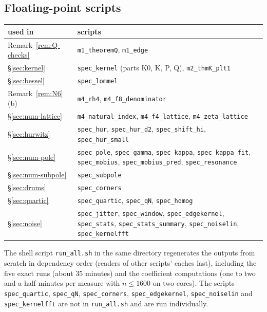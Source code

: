 \subsection*{Floating-point scripts}
\begin{center}
\small
\begin{tabular}{lp{10cm}}
\toprule
used in & scripts\\
\midrule
Remark~\ref{rem:Q-checks} & \texttt{m1\_theoremQ}, \texttt{m1\_edge}\\
\S\ref{sec:kernel} & \texttt{spec\_kernel} (parts K0, K, P, Q), \texttt{m2\_thmK\_plt1}\\
\S\ref{sec:bessel} & \texttt{spec\_lommel}\\
Remark~\ref{rem:N6}(b) & \texttt{m4\_rh4}, \texttt{m4\_f8\_denominator}\\
\S\ref{sec:num-lattice} & \texttt{m4\_natural\_index}, \texttt{m4\_f4\_lattice}, \texttt{m4\_zeta\_lattice}\\
\S\ref{sec:hurwitz} & \texttt{spec\_hur}, \texttt{spec\_hur\_d2}, \texttt{spec\_shift\_hi}, \texttt{spec\_hur\_small}\\
\S\ref{sec:num-pole} & \texttt{spec\_pole}, \texttt{spec\_gamma}, \texttt{spec\_kappa}, \texttt{spec\_kappa\_fit},
  \texttt{spec\_mobius}, \texttt{spec\_mobius\_pred}, \texttt{spec\_resonance}\\
\S\ref{sec:num-subpole} & \texttt{spec\_subpole}\\
\S\ref{sec:drums} & \texttt{spec\_corners}\\
\S\ref{sec:quartic} & \texttt{spec\_quartic}, \texttt{spec\_qN}, \texttt{spec\_homog}\\
\S\ref{sec:noise} & \texttt{spec\_jitter}, \texttt{spec\_window}, \texttt{spec\_edgekernel}, \texttt{spec\_stats},
  \texttt{spec\_stats\_summary}, \texttt{spec\_noiselin}, \texttt{spec\_kernelfft}\\
\bottomrule
\end{tabular}
\end{center}

The shell script \texttt{run\_all.sh} in the same directory regenerates the outputs from scratch in dependency order
(readers of other scripts' caches last), including the five exact runs (about $35$ minutes) and the coefficient
computations (one to two and a half minutes per measure with $n\le1600$ on two cores). The scripts \texttt{spec\_quartic},
\texttt{spec\_qN}, \texttt{spec\_corners}, \texttt{spec\_edgekernel}, \texttt{spec\_noiselin} and \texttt{spec\_kernelfft} are not in
\texttt{run\_all.sh} and are run individually.
